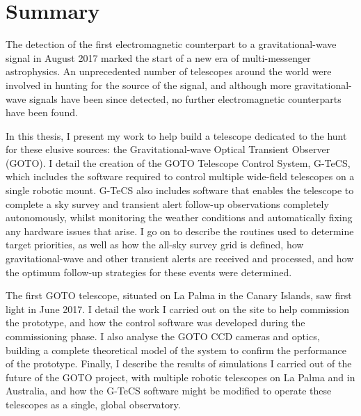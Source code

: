 \chapter*{Summary}

\begin{onehalfspace}

The detection of the first electromagnetic counterpart to a gravitational-wave signal in August 2017 marked the start of a new era of multi-messenger astrophysics. An unprecedented number of telescopes around the world were involved in hunting for the source of the signal, and although more gravitational-wave signals have been since detected, no further electromagnetic counterparts have been found.

\medskip

In this thesis, I present my work to help build a telescope dedicated to the hunt for these elusive sources: the Gravitational-wave Optical Transient Observer (GOTO). I detail the creation of the GOTO Telescope Control System, G-TeCS, which includes the software required to control multiple wide-field telescopes on a single robotic mount. G-TeCS also includes software that enables the telescope to complete a sky survey and transient alert follow-up observations completely autonomously, whilst monitoring the weather conditions and automatically fixing any hardware issues that arise. I go on to describe the routines used to determine target priorities, as well as how the all-sky survey grid is defined, how gravitational-wave and other transient alerts are received and processed, and how the optimum follow-up strategies for these events were determined.

\medskip

The first GOTO telescope, situated on La Palma in the Canary Islands, saw first light in June 2017. I detail the work I carried out on the site to help commission the prototype, and how the control software was developed during the commissioning phase. I also analyse the GOTO CCD cameras and optics, building a complete theoretical model of the system to confirm the performance of the prototype. Finally, I describe the results of simulations I carried out of the future of the GOTO project, with multiple robotic telescopes on La Palma and in Australia, and how the G-TeCS software might be modified to operate these telescopes as a single, global observatory.

\end{onehalfspace}

